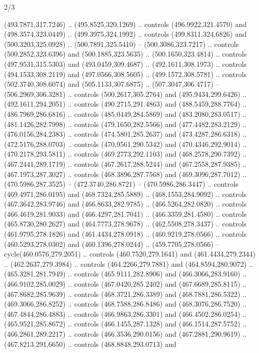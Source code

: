 \begin{flagdescription}{2/3}
\begin{scope}[xshift=0.5\flaglength,yshift=0.5\flagwidth,scale=\flagwidth/495.65]
\begin{scope}[y=0.8pt, x=0.8pt, yscale=-1,shift={(-463.76,-309.78)}]
  (493.7871,317.7246) .. (495.8525,320.1269) .. controls (496.9922,321.4570) and
  (498.3574,323.0449) .. (499.3975,324.1992) .. controls (499.8311,324.6826) and
  (500.3203,325.0928) .. (500.7891,325.5410) -- (500.3086,323.7217) .. controls
  (500.2852,323.6396) and (500.1885,323.5635) .. (500.1650,323.4814) .. controls
  (497.9531,315.5303) and (493.0459,309.4687) .. (492.1611,308.1973) .. controls
  (494.1533,308.2119) and (497.0566,308.5605) .. (499.1572,308.5781) .. controls
  (502.3740,308.6074) and (505.1133,307.6875) .. (507.3047,306.4717) --
  (506.2969,306.3281) .. controls (500.2617,305.2764) and (495.9434,299.6426) ..
  (492.1611,294.2051) .. controls (490.2715,291.4863) and (488.5459,288.7764) ..
  (486.7969,286.6816) .. controls (485.0449,284.5869) and (483.2080,283.0517) ..
  (481.1426,282.7998) .. controls (479.1650,282.5566) and (477.4482,283.2129) ..
  (476.0156,284.2383) .. controls (474.5801,285.2637) and (473.4287,286.6318) ..
  (472.5176,288.0703) .. controls (470.9561,290.5342) and (470.4346,292.9014) ..
  (470.2178,293.5811) .. controls (469.2773,292.1103) and (468.2578,290.7392) ..
  (467.2441,289.1719) .. controls (467.2617,288.5244) and (467.2558,287.9385) ..
  (467.1973,287.3027) .. controls (468.3896,287.7568) and (469.3096,287.7012) ..
  (470.5986,287.3525) -- (472.3740,286.8721) -- (470.5986,286.3447) .. controls
  (469.4971,286.0195) and (468.7324,285.5889) .. (468.1553,284.9092) .. controls
  (467.3642,283.9746) and (466.8633,282.9785) .. (466.5264,282.0820) .. controls
  (466.4619,281.9033) and (466.4297,281.7041) .. (466.3359,281.4580) .. controls
  (465.8730,280.2627) and (464.7773,278.9678) .. (462.5508,278.3437) .. controls
  (461.9795,278.1826) and (461.4434,278.0918) .. (460.9219,278.0566) .. controls
  (460.5293,278.0302) and (460.1396,278.0244) .. (459.7705,278.0566) --
  cycle(460.0576,279.2051) .. controls (460.7520,279.1641) and
  (461.4434,279.2344) .. (462.2637,279.3984) .. controls (464.2266,279.7881) and
  (464.8594,280.9072) .. (465.3281,281.7949) .. controls (465.9111,282.8906) and
  (466.3066,283.9160) .. (466.9102,285.0029) .. controls (467.0420,285.2402) and
  (467.6689,285.8115) .. (467.8682,285.9639) .. controls (468.3721,286.3389) and
  (468.7881,286.5322) .. (469.3066,286.8252) .. controls (468.7588,286.8486) and
  (468.3076,286.7520) .. (467.4844,286.4883) .. controls (466.9863,286.3301) and
  (466.4502,286.0254) .. (465.9521,285.8672) .. controls (466.1455,287.1328) and
  (466.1514,287.5752) .. (466.2861,289.2217) .. controls (466.3536,290.0156) and
  (467.2881,290.9619) .. (467.8213,291.6650) .. controls (468.8848,293.0713) and

\end{scope}
\end{scope}
\end{flagdescription}
